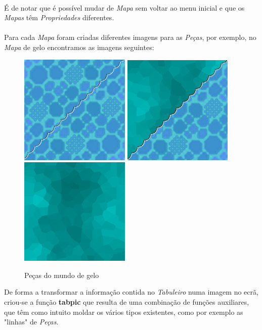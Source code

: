 \documentclass[12pt,a4paper]{report}
\begin{document}
\paragraph{} É de notar que é possível mudar de \textit{Mapa} sem voltar ao menu inicial e que os \textit{Mapas} têm  \textit{Propriedades} diferentes. 
\paragraph{} Para cada \textit{Mapa} foram criadas diferentes imagens para as \textit{Peças}, por exemplo, no \textit{Mapa} de gelo encontramos as imagens seguintes:

\begin{figure}[H]
\caption{Peças do mundo de gelo}
\centering
\includegraphics[scale = 0.5]{agua.png}
\includegraphics[scale = 0.5]{aguacurva.png}
\includegraphics[scale = 0.51]{gelo.png}
\end{figure}
De forma a transformar a informação contida no \textit{Tabuleiro} numa imagem no ecrã, criou-se a função \textbf{tabpic} que resulta de uma combinação de funções auxiliares, que têm como intuito moldar os vários tipos existentes, como por exemplo as "linhas" de \textit{Peças}.
\end{document}

